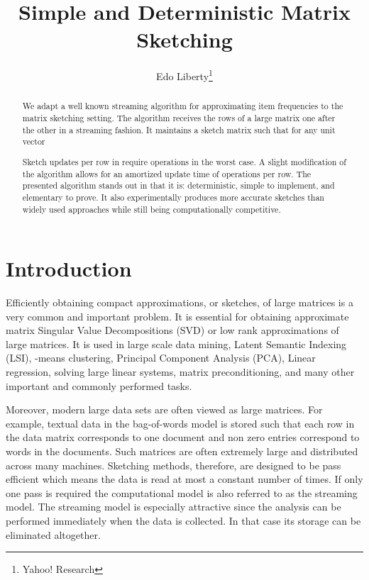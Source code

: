 \documentclass[]{article}
\title{Simple and Deterministic Matrix Sketching}
\author{Edo Liberty\thanks{Yahoo! Research}}
\date{\nonumber}
\begin{document}
\maketitle

\begin{abstract}
We adapt a well known streaming algorithm for approximating item frequencies to the matrix sketching setting. 
The algorithm receives the rows of a large matrix  one after the other in a streaming fashion. 
It maintains a sketch matrix  such that for any unit vector 

Sketch updates per row in  require  operations in the worst case.
A slight modification of the algorithm allows for an amortized update time of  operations per row. 
The presented algorithm stands out in that it is: deterministic, simple to implement, and elementary to prove.
It also experimentally produces more accurate sketches than widely used approaches while still being computationally competitive.
\end{abstract}

\section{Introduction}
Efficiently obtaining compact approximations, or sketches, of large matrices is a very common and important problem.
It is essential for obtaining approximate matrix Singular Value Decompositions (SVD) or low rank approximations of large matrices.
It is used in large scale data mining, Latent Semantic Indexing (LSI), -means clustering, Principal Component Analysis (PCA), Linear regression, solving large linear systems, matrix preconditioning, and many other important and commonly performed tasks.

Moreover, modern large data sets are often viewed as large matrices.
For example, textual data in the bag-of-words model is stored such that each row in the data matrix 
corresponds to one document and non zero entries correspond to words in the documents.
Such matrices are often extremely large and distributed across many machines.
Sketching methods, therefore, are designed to be pass efficient which means the data is read at most a constant number of times.
If only one pass is required the computational model is also referred to as the streaming model. 
The streaming model is especially attractive since the analysis can be performed immediately when the data is collected.
In that case its storage can be eliminated altogether. 
\end{document}
